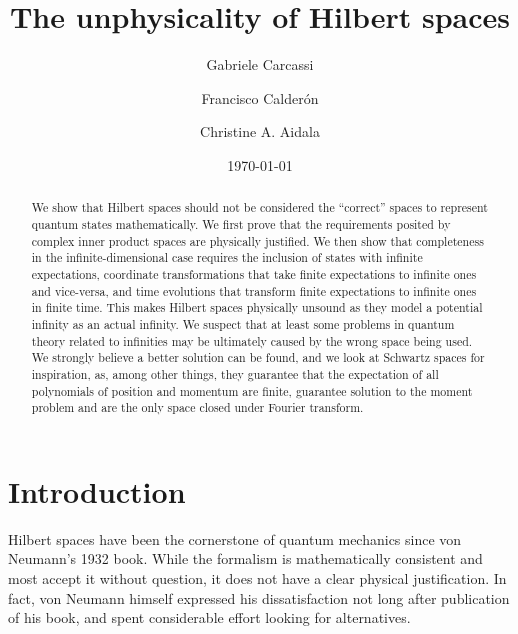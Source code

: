 \documentclass[10pt,twocolumn, nofootinbib]{revtex4-2}
\begin{document}
\title{The unphysicality of Hilbert spaces}
\author{Gabriele Carcassi}
\author{Francisco Calder\'on}
\author{Christine A. Aidala}

\date{\today}


\begin{abstract}
We show that Hilbert spaces should not be considered the ``correct'' spaces to represent quantum states mathematically. We first prove that the requirements posited by complex inner product spaces are physically justified. We then show that completeness in the infinite-dimensional case requires the inclusion of states with infinite expectations, coordinate transformations that take finite expectations to infinite ones and vice-versa, and time evolutions that transform finite expectations to infinite ones in finite time. This makes Hilbert spaces physically unsound as they model a potential infinity as an actual infinity. We suspect that at least some problems in quantum theory related to infinities may be ultimately caused by the wrong space being used. We strongly believe a better solution can be found, and we look at Schwartz spaces for inspiration, as, among other things, they guarantee that the expectation of all polynomials of position and momentum are finite, guarantee solution to the moment problem and are the only space closed under Fourier transform.
\end{abstract}

\maketitle

\section{Introduction}

Hilbert spaces have been the cornerstone of quantum mechanics since von Neumann's 1932 book.\cite{von_neumann_mathematische_1996} While the formalism is mathematically consistent and most accept it without question, it does not have a clear physical justification.\cite{heathcote_1990, hardy_2001} In fact, von Neumann himself expressed his dissatisfaction not long after publication of his book, and spent considerable effort looking for alternatives.\cite{vonNeumannHilbert_1996}
\end{document}
